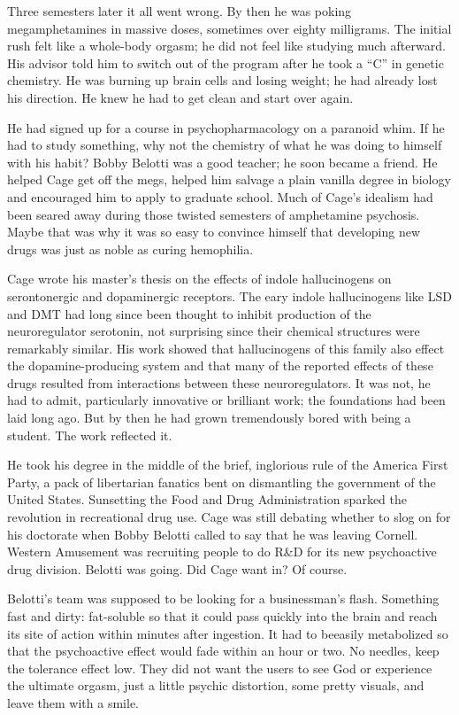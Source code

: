 Three semesters later it all went wrong. By then he was poking megamphetamines in massive doses, sometimes over eighty milligrams. The initial rush felt like a whole-body orgasm; he did not feel like studying much afterward. His advisor told him to switch out of the program after he took a ``C'' in genetic chemistry. He was burning up brain cells and losing weight; he had already lost his direction. He knew he had to get clean and start over again.

He had signed up for a course in psychopharmacology on a paranoid whim. If he had to study something, why not the chemistry of what he was doing to himself with his habit? Bobby Belotti was a good teacher; he soon became a friend. He helped Cage get off the megs, helped him salvage a plain vanilla degree in biology and encouraged him to apply to graduate school. Much of Cage's idealism had been seared away during those twisted semesters of amphetamine psychosis. Maybe that was why it was so easy to convince himself that developing new drugs was just as noble as curing hemophilia.

Cage wrote his master's thesis on the effects of indole hallucinogens on serontonergic and dopaminergic receptors. The eary indole hallucinogens like LSD and DMT had long since been thought to inhibit production of the neuroregulator serotonin, not surprising since their chemical structures were remarkably similar. His work showed that hallucinogens of this family also effect the dopamine-producing system and that many of the reported effects of these drugs resulted from interactions between these neuroregulators. It was not, he had to admit, particularly innovative or brilliant work; the foundations had been laid long ago. But by then he had grown tremendously bored with being a student. The work reflected it.

He took his degree in the middle of the brief, inglorious rule of the America First Party, a pack of libertarian fanatics bent on dismantling the government of the United States. Sunsetting the Food and Drug Administration sparked the revolution in recreational drug use. Cage was still debating whether to slog on for his doctorate when Bobby Belotti called to say that he was leaving Cornell. Western Amusement was recruiting people to do R\&D for its new psychoactive drug division. Belotti was going. Did Cage want in? Of course.

Belotti's team was supposed to be looking for a businessman's flash. Something fast and dirty: fat-soluble so that it could pass quickly into the brain and reach its site of action within minutes after ingestion. It had to beeasily metabolized so that the psychoactive effect would fade within an hour or two. No needles, keep the tolerance effect low. They did not want the users to see God or experience the ultimate orgasm, just a little psychic distortion, some pretty visuals, and leave them with a smile.

